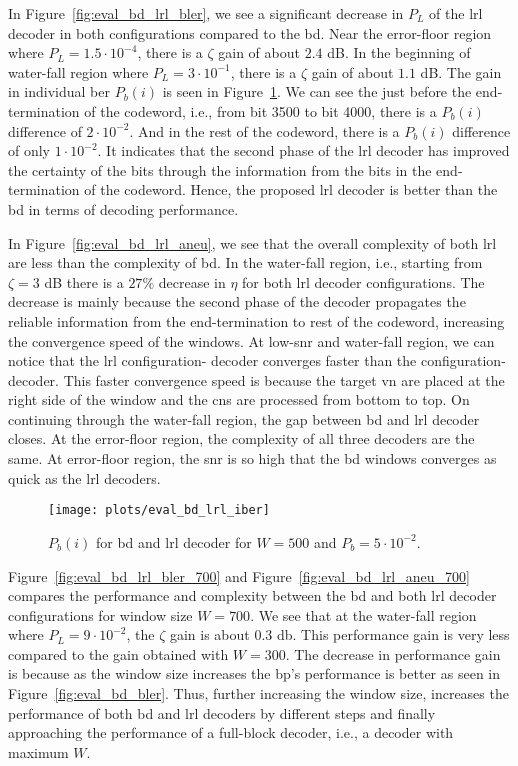 In Figure~\ref{fig:eval_bd_lrl_bler}, we see a significant decrease in $P_L$ of the \gls{lrl} decoder in both configurations compared to the \gls{bd}. Near the error-floor region where $P_L=1.5\cdot 10^{-4}$, there is a $\zeta$ gain of about $2.4$ dB. In the beginning of water-fall region where $P_L=3\cdot 10^{-1}$, there is a $\zeta$ gain of about $1.1$ dB. The gain in individual \gls{ber} $P_b(i)$ is seen in Figure~\ref{fig:eval_bd_lrl_iber}. We can see the just before the end-termination of the codeword, i.e., from bit 3500 to bit 4000, there is a $P_b(i)$ difference of $2\cdot 10^{-2}$. And in the rest of the codeword, there is a $P_b(i)$ difference of only $1\cdot 10^{-2}$. It indicates that the second phase of the \gls{lrl} decoder has improved the certainty of the bits through the information from the bits in the end-termination of the codeword. Hence, the proposed \gls{lrl} decoder is better than the \gls{bd} in terms of decoding performance.

In Figure~\ref{fig:eval_bd_lrl_aneu}, we see that the overall complexity of both \gls{lrl} are less than the complexity of \gls{bd}. In the water-fall region, i.e., starting from $\zeta=3$ dB there is a $27\%$ decrease in $\eta$ for both \gls{lrl} decoder configurations. The decrease is mainly because the second phase of the decoder propagates the reliable information from the end-termination to rest of the codeword, increasing the convergence speed of the windows. At low-\gls{snr} and water-fall region, we can notice that the \gls{lrl} configuration- decoder converges faster than the configuration- decoder. This faster convergence speed is because the target \gls{vn} are placed at the right side of the window and the \glspl{cn} are processed from bottom to top. On continuing through the water-fall region, the gap between \gls{bd} and \gls{lrl} decoder closes. At the error-floor region, the complexity of all three decoders are the same. At error-floor region, the \gls{snr} is so high that the \gls{bd} windows converges as quick as the \gls{lrl} decoders.
\begin{figure}[htbp]
  \centering
  \texttt{[image: plots/eval\_bd\_lrl\_iber]}
  \caption[Individual \acrshort{ber} of \acrshort{bd} and \acrshort{lrl}.]{$P_b(i)$ for \gls{bd} and \gls{lrl} decoder for $W=500$ and $P_b=5\cdot 10^{-2}$.}
  \label{fig:eval_bd_lrl_iber}
\end{figure}

Figure~\ref{fig:eval_bd_lrl_bler_700} and Figure~\ref{fig:eval_bd_lrl_aneu_700} compares the performance and complexity between the \gls{bd} and both \gls{lrl} decoder configurations for window size $W=700$. We see that at the water-fall region where $P_L=9\cdot 10^{-2}$, the $\zeta$ gain is about $0.3$ db. This performance gain is very less compared to the gain obtained with $W=300$. The decrease in performance gain is because as the window size increases the \gls{bp}'s performance is better as seen in Figure~\ref{fig:eval_bd_bler}. Thus, further increasing the window size, increases the performance of both \gls{bd} and \gls{lrl} decoders by different steps and finally approaching the performance of a full-block decoder, i.e., a decoder with maximum $W$.

